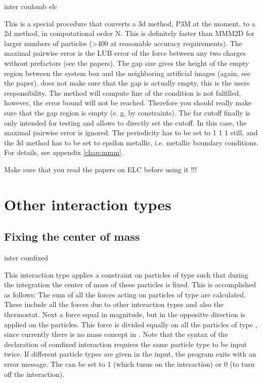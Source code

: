 \begin{essyntax}
  inter coulomb elc  
\end{essyntax}
This is a special procedure that converts a 3d method, \ie P3M at the
moment, to a 2d method, in computational order N. This is definitely
faster than MMM2D for larger numbers of particles (>400 at reasonable
accuracy requirements). The maximal pairwise error is the LUB error of
the force between any two charges without prefactors (see the papers).
The gap size gives the height of the empty region between the system
box and the neighboring artificial images (again, see the paper).
\es{} does not make sure that the gap is actually empty, this is the
users responsibility. The method will compute fine of the condition is
not fulfilled, however, the error bound will not be reached. Therefore
you should really make sure that the gap region is empty (e. g. by
constraints). The far cutoff finally is only intended for testing and
allows to directly set the cutoff. In this case, the maximal pairwise
error is ignored. The periodicity has to be set to 1 1 1 still, and
the 3d method has to be set to epsilon metallic, i.e.  metallic
boundary conditions. For details, see appendix \vref{chap:mmm}.

Make sure that you read the papers on ELC before using it !!!

\section{Other interaction types}
\label{sec:inter-other}

\subsection{Fixing the center of mass}
\begin{essyntax}
  inter  
  comfixed 
\end{essyntax}
This interaction type applies a constraint on particles of type
 such that during the integration the
center of mass of these particles is fixed. This is accomplished as
follows: The sum of all the forces acting on particles of type
 are calculated. These include all the
forces due to other interaction types and also the thermostat. Next a
force equal in magnitude, but in the oppositte direction is applied on
the particles. This force is divided equally on all the particles of
type , since currently there is no mass
concept in \es. Note that the syntax of the declaration of comfixed
interaction requires the same particle type to be input twice. If
different particle types are given in the input, the program exits
with an error message. The  can be set to 1 (which
turns on the interaction) or 0 (to turn off the interaction).

